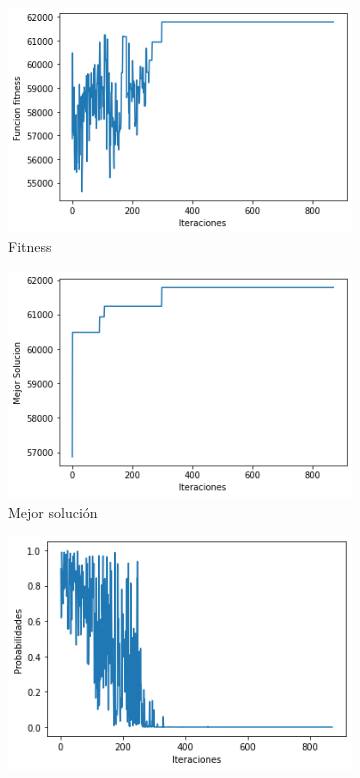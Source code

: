 \documentclass[a4paper,12pt]{article}
\begin{document}
	
	\begin{figure}[H]
		\centering
		\begin{subfigure}{0.24\textwidth}
			\centering
			\includegraphics[width=\textwidth]{include/L5/fitness.png}
			\caption{Fitness}
		\end{subfigure}
		\hfill
		\begin{subfigure}{0.24\textwidth}
			\centering
			\includegraphics[width=\textwidth]{include/L5/mejor_solucion.png}
			\caption{Mejor solución}
		\end{subfigure}
		\hfill
		\begin{subfigure}{0.24\textwidth}
			\centering
			\includegraphics[width=\textwidth]{include/L5/probabilidades.png}

\end{subfigure}
\end{figure}
\end{document}

